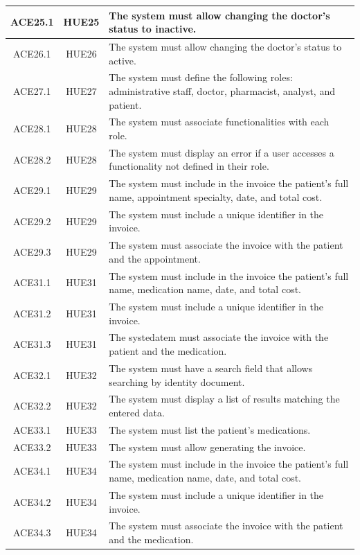 \documentclass{prgrado}
\begin{document}
\begin{longtable}{|c|c|p{9cm}|}
ACE25.1 & HUE25 & The system must allow changing the doctor's status to inactive. \\ \hline
ACE26.1 & HUE26 & The system must allow changing the doctor's status to active. \\ \hline

ACE27.1 & HUE27 & The system must define the following roles: administrative staff, doctor, pharmacist, analyst, and patient. \\ \hline

ACE28.1 & HUE28 & The system must associate functionalities with each role. \\ \hline
ACE28.2 & HUE28 & The system must display an error if a user accesses a functionality not defined in their role. \\ \hline

ACE29.1 & HUE29 & The system must include in the invoice the patient's full name, appointment specialty, date, and total cost. \\ \hline
ACE29.2 & HUE29 & The system must include a unique identifier in the invoice. \\ \hline
ACE29.3 & HUE29 & The system must associate the invoice with the patient and the appointment. \\ \hline

ACE31.1 & HUE31 & The system must include in the invoice the patient's full name, medication name, date, and total cost. \\ \hline
ACE31.2 & HUE31 & The system must include a unique identifier in the invoice. \\ \hline
ACE31.3 & HUE31 & The systedatem must associate the invoice with the patient and the medication. \\ \hline

ACE32.1 & HUE32 & The system must have a search field that allows searching by identity document. \\ \hline
ACE32.2 & HUE32 & The system must display a list of results matching the entered data. \\ \hline

ACE33.1 & HUE33 & The system must list the patient's medications. \\ \hline
ACE33.2 & HUE33 & The system must allow generating the invoice. \\ \hline

ACE34.1 & HUE34 & The system must include in the invoice the patient's full name, medication name, date, and total cost. \\ \hline
ACE34.2 & HUE34 & The system must include a unique identifier in the invoice. \\ \hline
ACE34.3 & HUE34 & The system must associate the invoice with the patient and the medication. \\ \hline


\end{longtable}
\end{document}
